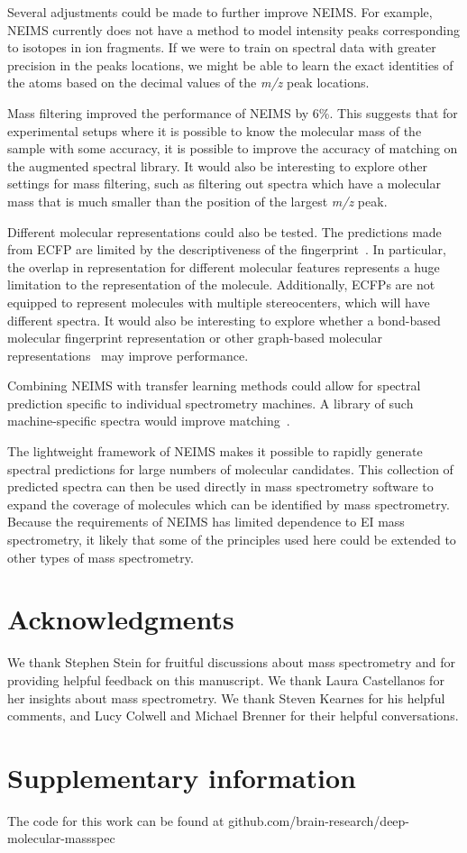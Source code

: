\documentclass{article}
\begin{document}
Several adjustments could be made to further improve NEIMS. For example, NEIMS currently does not have a method to model intensity peaks corresponding to isotopes in ion fragments. If we were to train on spectral data with greater precision in the peaks locations, we might be able to learn the exact identities of the atoms based on the decimal values of the \textit{m/z} peak locations.

Mass filtering improved the performance of NEIMS by 6\%. This suggests that for experimental setups where it is possible to know the molecular mass of the sample with some accuracy, it is possible to improve the accuracy of matching on the augmented spectral library. It would also be interesting to explore other settings for mass filtering, such as filtering out spectra which have a molecular mass that is much smaller than the position of the largest \textit{m/z} peak.

Different molecular representations could also be tested. The predictions made from ECFP are limited by the descriptiveness of the fingerprint~\cite{rdkit_blogpost_collide_bits}. In particular, the overlap in representation for different molecular features represents a huge limitation to the representation of the molecule. Additionally, ECFPs are not equipped to represent molecules with multiple stereocenters, which will have different spectra. It would also be interesting to explore whether a bond-based molecular fingerprint representation \cite{kearnes2016molecular} or other graph-based molecular representations~\cite{duvenaud_convolutional_2015, gilmer_2017_mpnn} may improve performance.

Combining NEIMS with transfer learning methods could allow for spectral prediction specific to individual spectrometry machines. A library of such machine-specific spectra would improve matching~\cite{stein2012MassLibReview}.

The lightweight framework of NEIMS makes it possible to rapidly generate spectral predictions for large numbers of molecular candidates. This collection of predicted spectra can then be used directly in mass spectrometry software to expand the coverage of molecules which can be identified by mass spectrometry. Because the requirements of NEIMS has limited dependence to EI mass spectrometry, it likely that some of the principles used here could be extended to other types of mass spectrometry.


\section{Acknowledgments}
We thank Stephen Stein for fruitful discussions about mass spectrometry and for providing helpful feedback on this manuscript. We thank Laura Castellanos for her insights about mass spectrometry. We thank Steven Kearnes for his helpful comments, and Lucy Colwell and Michael Brenner for their helpful conversations.

\section{Supplementary information}
The code for this work can be found at github.com/brain-research/deep-molecular-massspec



\end{document}
